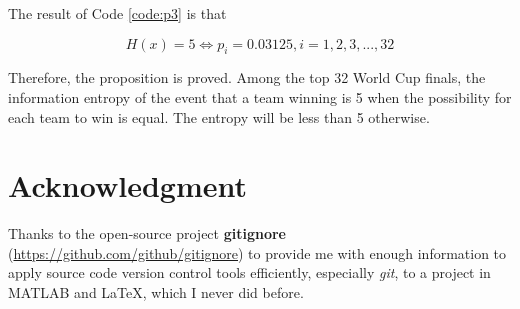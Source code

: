 \documentclass[12pt]{article}
\begin{document}
The result of Code \ref{code:p3} is that

\begin{equation}
	H(x)=5  \iff  p_i=0.03125, i=1,2,3,...,32
\end{equation}

Therefore, the proposition is proved. Among the top 32 World Cup finals, the information entropy of the event that a team winning is 5 when the possibility for each team to win is equal. The entropy will be less than 5 otherwise.
\section{Acknowledgment}

Thanks to the open-source project \textbf{gitignore} (\url{https://github.com/github/gitignore}) to provide me with enough information to apply source code version control tools efficiently, especially \textit{git}, to a project in MATLAB and \LaTeX, which I never did before.
\end{document}
